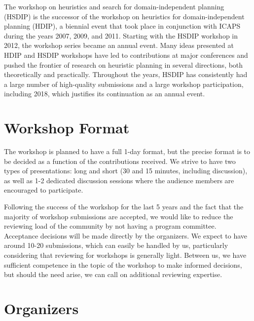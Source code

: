 \documentclass[10pt]{article}
\begin{document}
The workshop on heuristics and search for domain-independent planning (HSDIP) is
the successor of the workshop on heuristics for domain-independent planning
(HDIP), a biennial event that took place in conjunction with ICAPS during the
years 2007, 2009, and 2011. Starting with the HSDIP workshop in 2012, the
workshop series became an annual event.
Many ideas presented at HDIP and HSDIP workshops have led to contributions at
major conferences and pushed the frontier of research on heuristic planning in
several directions, both theoretically and practically.
Throughout the years, HSDIP has consistently had a large number of
high-quality submissions and a large workshop participation, including 2018,
which justifies its continuation as an annual event.

\section*{Workshop Format}

The workshop is planned to have a full 1-day format, but the precise
format is to be decided as a function of the contributions received.
We strive to have two types of presentations: long and short (30 and
15 minutes, including discussion), as well as 1-2 dedicated discussion
sessions where the audience members are encouraged to participate.

Following the success of the workshop for the last 5 years and the fact
that the majority of workshop submissions are accepted, we would like to reduce
the reviewing load of the community by not having a program
committee. Acceptance decisions will be made directly by the
organizers. We expect to have around 10-20 submissions, which can
easily be handled by us, particularly considering that reviewing for
workshops is generally light. Between us, we have sufficient
competence in the topic of the workshop to make informed decisions,
but should the need arise, we can call on additional reviewing
expertise.

\section*{Organizers}
\end{document}
